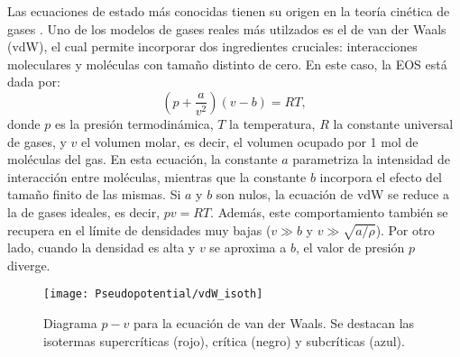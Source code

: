 Las ecuaciones de estado m\'as conocidas tienen su origen en la teor\'ia cin\'etica de gases \cite{blundell_concepts_2006}. Uno de los modelos de gases reales m\'as utilzados es el de van der Waals (vdW), el cual permite incorporar dos ingredientes cruciales: interacciones moleculares y mol\'eculas con tama\~no distinto de cero. En este caso, la EOS est\'a dada por:
\begin{equation}
	\left( p + \dfrac{a}{v^2} \right) \left( v-b \right) = RT,
\end{equation}
donde $p$ es la presi\'on termodin\'amica, $T$ la temperatura, $R$ la constante universal de gases, y $v$ el volumen molar, es decir, el volumen ocupado por 1 mol de mol\'eculas del gas. En esta ecuaci\'on, la constante $a$ parametriza la intensidad de interacci\'on entre mol\'eculas, mientras que la constante $b$ incorpora el efecto del tama\~no finito de las mismas. Si $a$ y $b$ son nulos, la ecuaci\'on de vdW se reduce a la de gases ideales, es decir, $pv = RT$. Adem\'as, este comportamiento tambi\'en se recupera en el l\'imite de densidades muy bajas ($v \gg b$ y $v \gg \sqrt{a/\rho}$). Por otro lado, cuando la densidad es alta y $v$ se aproxima a $b$, el valor de presi\'on $p$ diverge.

\begin{figure}[ht]
	\centering
	\texttt{[image: Pseudopotential/vdW\_isoth]}
	\caption{Diagrama $p-v$ para la ecuaci\'on de van der Waals. Se destacan las isotermas supercr\'iticas (rojo), cr\'itica (negro) y subcr\'iticas (azul).}
	\label{fig:vdW_isoth}
\end{figure}

